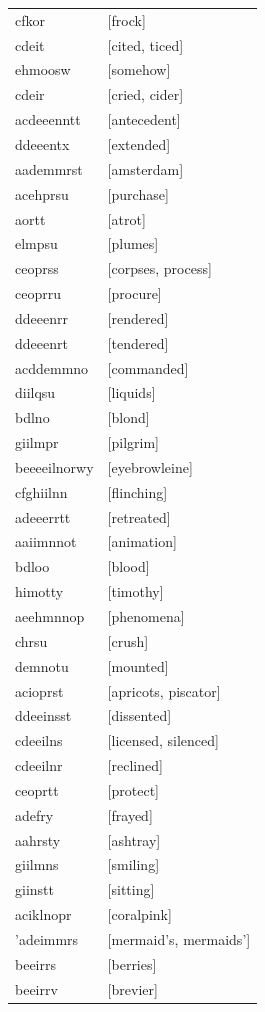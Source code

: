 \documentclass{article}
\begin{document}
\begin{tabular}{ll}
cfkor & [frock] \\
cdeit & [cited, ticed] \\
ehmoosw & [somehow] \\
cdeir & [cried, cider] \\
acdeeenntt & [antecedent] \\
ddeeentx & [extended] \\
aademmrst & [amsterdam] \\
acehprsu & [purchase] \\
aortt & [atrot] \\
elmpsu & [plumes] \\
ceoprss & [corpses, process] \\
ceoprru & [procure] \\
ddeeenrr & [rendered] \\
ddeeenrt & [tendered] \\
acddemmno & [commanded] \\
diilqsu & [liquids] \\
bdlno & [blond] \\
giilmpr & [pilgrim] \\
beeeeilnorwy & [eyebrowleine] \\
cfghiilnn & [flinching] \\
adeeerrtt & [retreated] \\
aaiimnnot & [animation] \\
bdloo & [blood] \\
himotty & [timothy] \\
aeehmnnop & [phenomena] \\
chrsu & [crush] \\
demnotu & [mounted] \\
acioprst & [apricots, piscator] \\
ddeeinsst & [dissented] \\
cdeeilns & [licensed, silenced] \\
cdeeilnr & [reclined] \\
ceoprtt & [protect] \\
adefry & [frayed] \\
aahrsty & [ashtray] \\
giilmns & [smiling] \\
giinstt & [sitting] \\
aciklnopr & [coralpink] \\
'adeimmrs & [mermaid's, mermaids'] \\
beeirrs & [berries] \\
beeirrv & [brevier] \\

\end{tabular}
\end{document}
